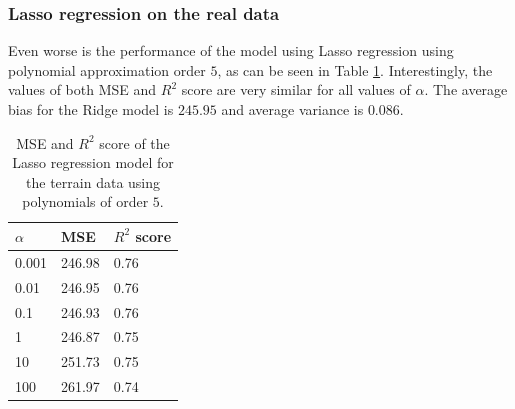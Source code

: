 \documentclass [11pt]{article}
\begin{document}
\subsubsection{Lasso regression on the real data}
Even worse is the performance of the model using Lasso regression using polynomial approximation order $5$, as can be seen in Table \ref{tab:ridge5Terrain}. Interestingly, the values of both MSE and $R^{2}$ score are very similar for all values of $\alpha$. The average bias for the Ridge model is $245.95$ and average variance is $0.086$.
\begin{table}[H]
\centering
\begin{tabular}{lll}
\hline
$\alpha$ & MSE    & $R^{2}$ score \\ \hline
0.001     & 246.98 & 0.76          \\
0.01      & 246.95 & 0.76          \\
0.1       & 246.93 & 0.76         \\
1         & 246.87 & 0.75          \\
10        & 251.73 & 0.75          \\
100       & 261.97 & 0.74          \\ \hline
\end{tabular}
\caption{MSE and $R^{2}$ score of the Lasso regression model for the terrain data using polynomials of order $5$.}
\label{tab:ridge5Terrain}
\end{table}
\end{document}

